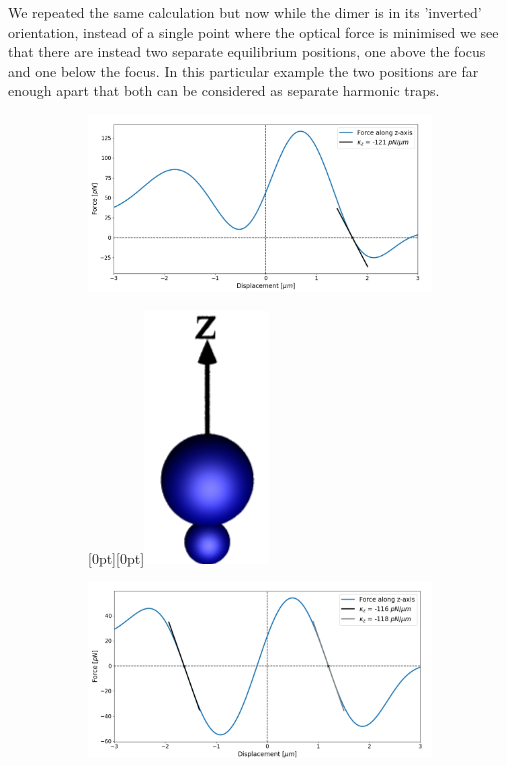 We repeated the same calculation but now while the 
dimer is in its 'inverted' orientation, instead of 
a single point where the optical force is minimised 
we see that there are instead two separate equilibrium 
positions, one above the focus and one below the 
focus. In this particular example the two positions 
are far enough apart that both can be considered as 
separate harmonic traps.    
\begin{figure}[h!]
	\centering
	\begin{subfigure}{.65\linewidth}
		\includegraphics[width=\linewidth]{lam=2_theta=0.png}
		\caption{}
		\label{lam=2}
	\end{subfigure}\hfill %
	\begin{subfigure}{.25\linewidth}
		\centering
		\raisebox{60pt}[0pt][0pt]{\makebox{}\includegraphics[width=0.3\linewidth, keepaspectratio]{theta=0.png}}
		\label{large over small}
	\end{subfigure}
	\medskip
	\begin{subfigure}{.65\linewidth}
		\includegraphics[width=\linewidth]{lam=2_theta=180.png}

\end{subfigure}
\end{figure}
